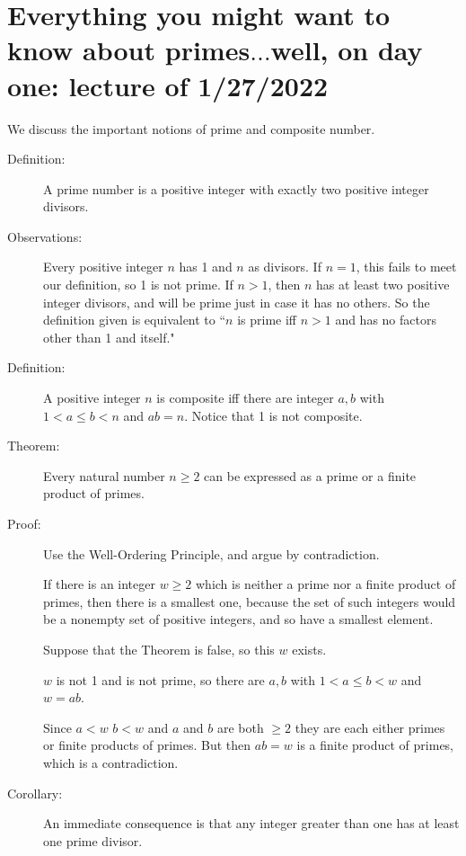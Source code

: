 \documentclass[12pt]{article}
\begin{document}
\section{Everything you might want to know about primes$\ldots$well, on day one:  lecture of 1/27/2022}

We discuss the important notions of prime and composite number.

\begin{description}

\item[Definition:]  A prime number is a positive integer with exactly two positive integer divisors.

\item[Observations:]  Every positive integer $n$ has 1 and $n$ as divisors.  If $n=1$, this fails to meet our definition, so 1
is not prime.  If $n>1$, then $n$ has at least two positive integer divisors, and will be prime just in case it has no others.
So the definition given is equivalent to ``$n$ is prime iff $n>1$ and has no factors other than 1 and itself."

\item[Definition:]  A positive integer $n$ is composite iff there are integer $a,b$ with $1<a \leq b < n$ and $ab=n$.
Notice that 1 is not composite.

\item[Theorem:]  Every natural number $n \geq 2$ can be expressed as a prime or a finite product of primes.

\item[Proof:]  Use the Well-Ordering Principle, and argue by contradiction.

If there is an integer $w \geq 2$ which is neither a prime nor a finite product of primes, then there is a smallest one, because the set of such integers would be a nonempty set of positive integers, and so have a smallest element.

Suppose that the Theorem is false, so this $w$ exists.

$w$ is not 1 and is not prime, so there are $a,b$ with $1<a\leq b <w$ and $w=ab$.

Since $a<w$ $b<w$ and $a$ and $b$ are both $\geq 2$ they are each either primes or finite products of primes.
But then $ab=w$ is a finite product of primes, which is a contradiction.

\item[Corollary:]  An immediate consequence is that any integer greater than one has at least one prime divisor.


\end{description}
\end{document}
